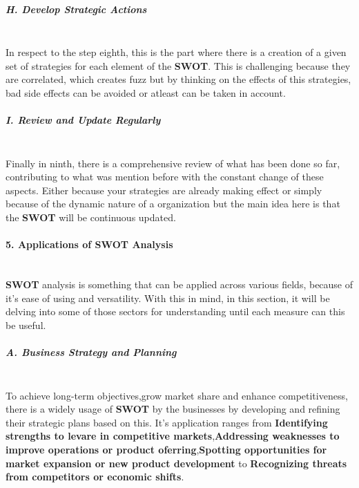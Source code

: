\subparagraph{H. Develop Strategic Actions}\mbox{}\\
In respect to the step eighth, this is the part where there is a creation of a given set of strategies for each element of the \textbf{SWOT}. This is challenging because they are correlated, which creates fuzz but by thinking on the effects of this strategies, bad side effects can be avoided or atleast can be taken in account.

\subparagraph{I. Review and Update Regularly}\mbox{}\\
Finally in ninth, there is a comprehensive review of what has been done so far, contributing to what was mention before with the constant change of these aspects. Either because your strategies are already making effect or simply because of the dynamic nature of a organization but the main idea here is that the \textbf{SWOT} will be continuous updated.

\paragraph{5. Applications of SWOT Analysis}\mbox{}\\
\textbf{SWOT} analysis is something that can be applied across various fields, because of it's ease of using and versatility. With this in mind, in this section, it will be delving into some of those sectors for understanding until each measure can this be useful.
\subparagraph{A. Business Strategy and Planning}\mbox{}\\
To achieve long-term objectives,grow market share and enhance competitiveness, there is a widely usage of \textbf{SWOT} by the businesses by developing and refining their strategic plans based on this. It's application ranges from \textbf{Identifying strengths to levare in competitive markets},\textbf{Addressing weaknesses to improve operations or product oferring},\textbf{Spotting opportunities for market expansion or new product development} to \textbf{Recognizing threats from competitors or economic shifts}.

